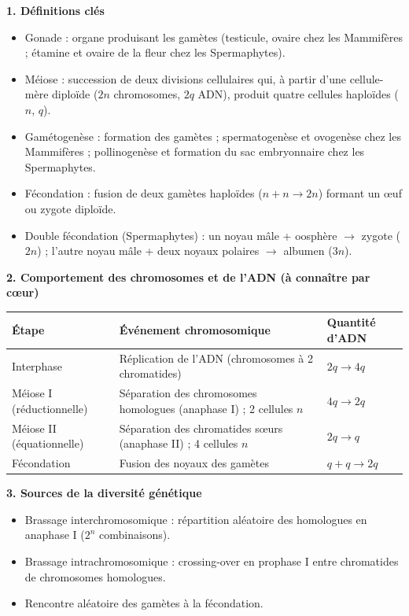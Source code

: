 \documentclass[11pt]{article}
\newcommand{\cle}[1]{{\popxbold\color{popdark}#1}}
\begin{document}
\begin{bilan}
\textbf{1. Définitions clés}
\begin{itemize}
  \item \cle{Gonade} : organe produisant les gamètes (testicule, ovaire chez les Mammifères ; étamine et ovaire de la fleur chez les Spermaphytes).
  \item \cle{Méiose} : succession de deux divisions cellulaires qui, à partir d'une cellule-mère diploïde ($2n$ chromosomes, $2q$ ADN), produit quatre cellules haploïdes ($n$, $q$).
  \item \cle{Gamétogenèse} : formation des gamètes ; spermatogenèse et ovogenèse chez les Mammifères ; pollinogenèse et formation du sac embryonnaire chez les Spermaphytes.
  \item \cle{Fécondation} : fusion de deux gamètes haploïdes ($n + n \to 2n$) formant un \oe uf ou zygote diploïde.
  \item \cle{Double fécondation} (Spermaphytes) : un noyau mâle + oosphère $\to$ zygote ($2n$) ; l'autre noyau mâle + deux noyaux polaires $\to$ albumen ($3n$).
\end{itemize}

\textbf{2. Comportement des chromosomes et de l'ADN (à connaître par c\oe ur)}
\begin{center}
\begin{tabularx}{\linewidth}{|l|X|X|}
\hline
\rowcolor{popblueL} \textbf{Étape} & \textbf{Événement chromosomique} & \textbf{Quantité d'ADN} \\
\hline
Interphase & Réplication de l'ADN (chromosomes à 2 chromatides) & $2q \to 4q$ \\
\hline
Méiose I (réductionnelle) & Séparation des chromosomes homologues (anaphase I) ; 2 cellules $n$ & $4q \to 2q$ \\
\hline
Méiose II (équationnelle) & Séparation des chromatides s\oe urs (anaphase II) ; 4 cellules $n$ & $2q \to q$ \\
\hline
Fécondation & Fusion des noyaux des gamètes & $q + q \to 2q$ \\
\hline
\end{tabularx}
\end{center}

\textbf{3. Sources de la diversité génétique}
\begin{itemize}
  \item \cle{Brassage interchromosomique} : répartition aléatoire des homologues en anaphase I ($2^{n}$ combinaisons).
  \item \cle{Brassage intrachromosomique} : crossing-over en prophase I entre chromatides de chromosomes homologues.
  \item Rencontre aléatoire des gamètes à la fécondation.
\end{itemize}


\end{bilan}
\end{document}
